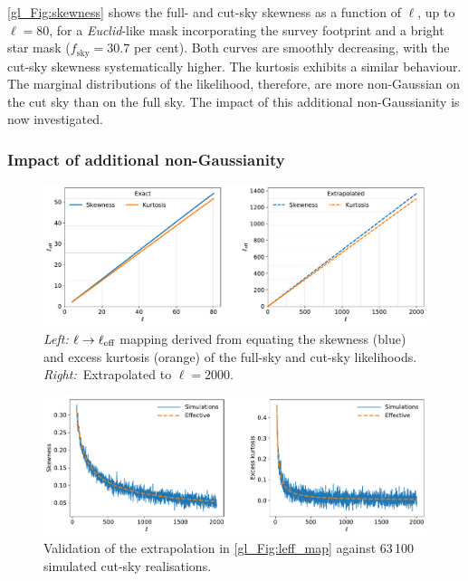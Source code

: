 \autoref{gl_Fig:skewness} shows the full- and cut-sky skewness as a function of $\ell$, up to $\ell = 80$, for a \textit{Euclid}-like mask incorporating the survey footprint and a bright star mask ($f_\text{sky} = 30.7$ per cent). Both curves are smoothly decreasing, with the cut-sky skewness systematically higher. The kurtosis exhibits a similar behaviour. The marginal distributions of the likelihood, therefore, are more non-Gaussian on the cut sky than on the full sky. The impact of this additional non-Gaussianity is now investigated.

\subsubsection{Impact of additional non-Gaussianity}
\label{gl_Sec:ma_marginals_impact}

\begin{figure}
\centering
\includegraphics[width=\textwidth]{leff_map}
\caption{\textit{Left:} $\ell \rightarrow \ell_\text{eff}$ mapping derived from equating the skewness (blue) and excess kurtosis (orange) of the full-sky and cut-sky likelihoods. \textit{Right:}~Extrapolated to $\ell = 2000$.}
\label{gl_Fig:leff_map}
\end{figure}

\begin{figure}
\centering
\includegraphics[width=\textwidth]{leff_validation}
\caption{Validation of the extrapolation in \autoref{gl_Fig:leff_map} against 63\,100 simulated cut-sky realisations.}
\label{gl_Fig:leff_validation}
\end{figure}

